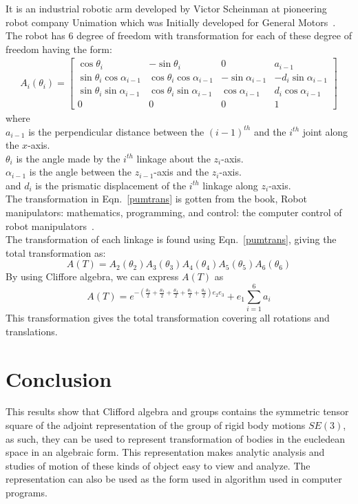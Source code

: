 \documentclass[12pt,onecolumn,letterpaper]{article} %
\begin{document}
It is an industrial robotic arm developed by Victor Scheinman at pioneering robot company Unimation which was Initially developed for General Motors~\cite{rosheim1994robot,fu1987robotics}.\\
The robot has 6 degree of freedom with transformation for each of these degree of freedom having the form:
\begin{align}
A_i(\theta_i)=
\left [
\begin{array}{llrr}
\cos\theta_i & -\sin\theta_i & 0 & a_{i-1} \\
\sin\theta_i\cos\alpha_{i-1} & \cos\theta_i\cos\alpha_{i-1}  & -\sin\alpha_{i-1} & -d_i\sin\alpha_{i-1}\\
\sin\theta_i\sin\alpha_{i-1} & \cos\theta_i\sin\alpha_{i-1} & \cos\alpha_{i-1} & d_i\cos\alpha_{i-1}\\
0 & 0 & 0 & 1
\end{array} \right]\label{pumtrans}
\end{align}
where\\
$a_{i-1}$ is the perpendicular distance between the $(i-1)^{th}$ and the $i^{th}$ joint along the $x$-axis.\\
$\theta_i$ is the angle made by the $i^{th}$ linkage about the $z_i$-axis.\\
$\alpha_{i-1}$ is the angle between the $z_{i-1}$-axis and the $z_i$-axis.\\ 
and $d_i$ is the prismatic displacement of the $i^{th}$ linkage along $z_i$-axis.\\
The transformation in Eqn.~\ref{pumtrans} is gotten from the book, Robot manipulators: mathematics, programming, and control: the computer control of robot manipulators~\cite{paul1981robot}.\\
The transformation of each linkage is found using Eqn.~\ref{pumtrans}, giving the total transformation as:
\begin{equation}
    A(T)=A_2(\theta_2)A_3(\theta_3)A_4(\theta_4)A_5(\theta_5)A_6(\theta_6)
\end{equation}
By using Cliffore algebra, we can express $A(T)$ as
\begin{equation}
 A(T)=e^{-\left(\frac{\theta_2}{2}+\frac{\theta_3}{2}+\frac{\theta_4}{2}+\frac{\theta_5}{2}+\frac{\theta_6}{2}\right)e_2e_3}+e_1\sum_{i=1}^{6} a_i
\end{equation}
This transformation gives the total transformation covering all rotations and translations.\\
\section{Conclusion}
This results show that Clifford algebra and groups contains the symmetric tensor square of the adjoint representation of the group of rigid body motions $SE(3)$, as such, they can be used to represent transformation of bodies in the eucledean space in an algebraic  form. This representation makes analytic analysis and studies of motion of these kinds of object easy to view and analyze. The representation can also be used as the form used in algorithm used in computer programs.


\end{document}
